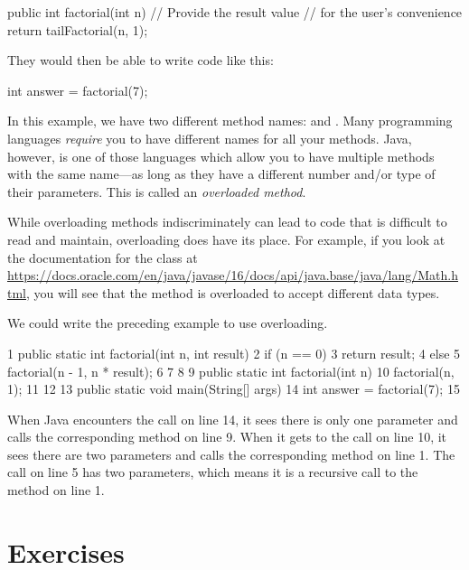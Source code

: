 \begin{code}
public int factorial(int n) {
    // Provide the result value
    // for the user's convenience
    return tailFactorial(n, 1); 
}
\end{code}

They would then be able to write code like this:

\begin{code}
int answer = factorial(7);
\end{code}

In this example, we have two different method names:  and . Many programming languages {\em require} you to have different names for all your methods. Java, however, is one of those languages which allow you to have multiple methods with the same name---as long as they have a different number and/or type of their parameters. This is called an {\em overloaded method}.

While overloading methods indiscriminately can lead to code that is difficult to read and maintain, overloading does have its place. For example, if you look at the documentation for the  class at \url{https://docs.oracle.com/en/java/javase/16/docs/api/java.base/java/lang/Math.html}, you will see that the  method is overloaded to accept different data types.

We could write the preceding example to use overloading.

\begin{code}
 1 public static int factorial(int n, int result) {
 2     if (n == 0) {
 3         return result;
 4     } else {
 5         factorial(n - 1, n * result);
 6     }
 7 }
 8 
 9 public static int factorial(int n) {
10     factorial(n, 1);
11 }
12 
13 public static void main(String[] args) {
14     int answer = factorial(7);
15 }
\end{code}

When Java encounters the call on line 14, it sees there is only one parameter and calls the corresponding  method on line 9. When it gets to the call on line 10, it sees there are two parameters and calls the corresponding  method on line 1. The call on line 5 has two parameters, which means it is a recursive call to the method on line 1.

\section{Exercises}

